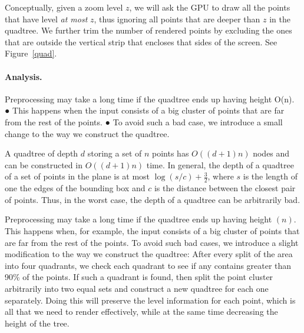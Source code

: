 \documentclass[11pt,a4paper]{article}
\begin{document}
Conceptually, given a zoom level $z$, we will ask the GPU to draw all the points that have level \emph{at most} $z$, thus ignoring
all points that are deeper than $z$ in the quadtree. 
We further trim the number of rendered points by excluding the ones that are outside the vertical strip 
that encloses that sides of the screen. See Figure~\ref{quad}.


\paragraph{Analysis.}

Preprocessing may take a long time if the quadtree ends up having height O(n).
● This happens when the input consists of a big
cluster of points that are far from the rest of the
points.
● To avoid such a bad case, we introduce a small
change to the way we construct the quadtree.

A quadtree of depth $d$ storing a set of $n$ points has $O((d + 1)n)$ nodes and can be constructed in $O((d + 1)n)$ time.
In general, the depth of a quadtree of a set of points in the plane is at most $\log (s/c) + \frac{3}{2}$, 
where $s$ is the length of one the edges of the bounding box and $c$ is the distance between 
the closest pair of points. Thus, in the worst case, the depth of a quadtree can be arbitrarily bad. 

Preprocessing may take a long time if the quadtree ends up having height $(n)$.
This happens when, for example, the input consists of a big cluster of points that are far from the rest of the
points. To avoid such bad cases, we introduce a slight modification to the way we construct the quadtree:
After every split of the area into four quadrants, we check each quadrant to see if any contains greater
than 90\% of the points. If such a quadrant is found, then split the point cluster arbitrarily into two equal sets and
construct a new quadtree for each one separately.
Doing this will preserve the level information for each point, which is all that we need to render effectively,
while at the same time decreasing the height of the tree.
\end{document}
